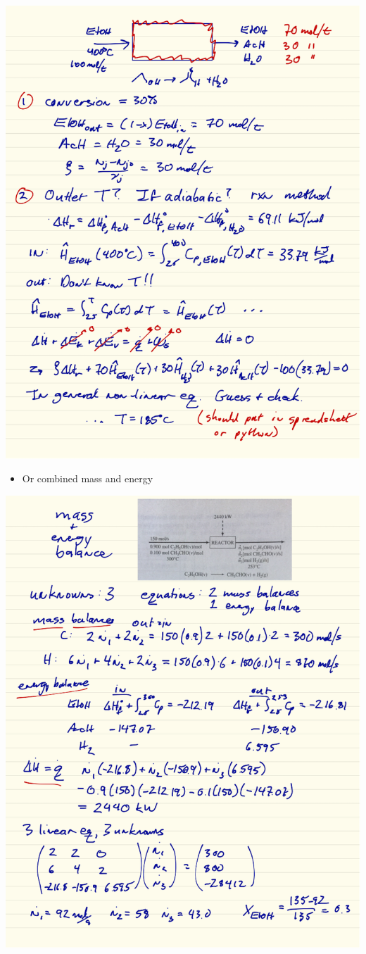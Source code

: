 \documentclass[11pt]{article}
\begin{document}
\includegraphics[width=.9\linewidth]{./figs/Adiabatic.png}

\begin{itemize}
\item Or combined mass and energy
\end{itemize}

\includegraphics[width=.9\linewidth]{./figs/MassEnergy2-1.png}
\end{document}
